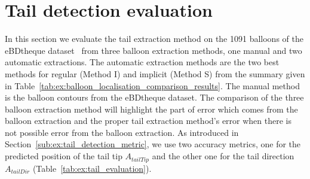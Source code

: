 



\section{Tail detection evaluation} %
\label{sec:tail_detection_evaluation}


In this section we evaluate the tail extraction method on the 1091 balloons of the eBDtheque dataset~\cite{Guerin2013} from three balloon extraction methods, one manual and two automatic extractions.
The automatic extraction methods are the two best methods for regular (Method I) and implicit (Method S) from the summary given in Table~\ref{tab:ex:balloon_localisation_comparison_results}.
The manual method is the balloon contours from the eBDtheque dataset.
The comparison of the three balloon extraction method will highlight the part of error which comes from the balloon extraction and the proper tail extraction method's error when there is not possible error from the balloon extraction.
As introduced in Section~\ref{sub:ex:tail_detection_metric}, we use two accuracy metrics, one for the predicted position of the tail tip $A_{tailTip}$ and the other one for the tail direction $A_{tailDir}$
 (Table~\ref{tab:ex:tail_evaluation}).




